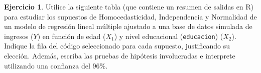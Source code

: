 \documentclass[
  11pt,
]{book}
\theoremstyle{definition}
\theoremstyle{definition}
\theoremstyle{definition}
\newtheorem{exercise}{Ejercicio}[chapter]
\theoremstyle{definition}
\theoremstyle{remark}
\begin{document}
\begin{exercise}

Utilice la siguiente tabla (que contiene un resumen de salidas en R) para estudiar los supuestos de Homocedasticidad, Independencia y Normalidad de un modelo de regresión lineal múltiple ajustado a una base de datos simulada de ingresos (\(Y\)) en función de edad (\(X_1\)) y nivel educacional (\texttt{educacion}) (\(X_2\)). Indique la fila del código seleccionado para cada supuesto, justificando su elección. Además, escriba las pruebas de hipótesis involucradas e interprete utilizando una confianza del 96\%.

\begin{table}[H]
\centering
{}
\end{table}

\end{exercise}
\end{document}
